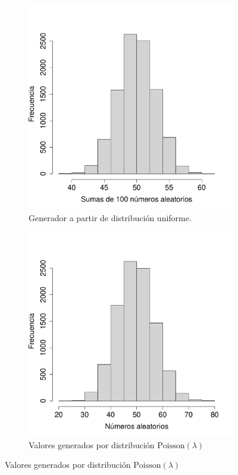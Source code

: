 \documentclass[paper=leter, fontsize=11pt]{scrartcl}
\numberwithin{equation}{section}		%
\numberwithin{figure}{section}			%
\numberwithin{table}{section}				%
\begin{document}
\begin{figure}
    \begin{subfigure}{.5\textwidth}
        \centering
        \includegraphics[scale=0.4]{unif.pdf}
        \caption{Generador a partir de distribución uniforme.}
        \label{unif_izq}
    \end{subfigure}
    \begin{subfigure}{0.5\textwidth}
        \centering
        \includegraphics[scale=0.4]{unif_poisson.pdf}
        \caption{Valores generados por distribución $\text{Poisson}(\lambda)$}
        \label{unif_der}
    \end{subfigure}


\end{figure}
\end{document}
